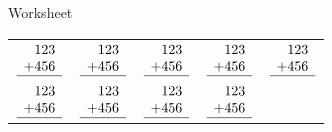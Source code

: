 \documentclass[20pt]{scrartcl}
\begin{document}
    \begin{center}
      \LARGE Worksheet
    \end{center}
    \begin{tabu} to \linewidth {XXXXX}
      $\begin{array}{r}
         123 \\
        +456 \\
        \hline
       \end{array}$
      &
      $\begin{array}{r}
         123 \\
        +456 \\
        \hline
       \end{array}$
      &
      $\begin{array}{r}
         123 \\
        +456 \\
        \hline
       \end{array}$
      &
      $\begin{array}{r}
         123 \\
        +456 \\
        \hline
       \end{array}$
      &
      $\begin{array}{r}
         123 \\
        +456 \\
        \hline
       \end{array}$
       \\ %
       $\begin{array}{r}
         123 \\
        +456 \\
        \hline
       \end{array}$
      &
      $\begin{array}{r}
         123 \\
        +456 \\
        \hline
       \end{array}$
      &
      $\begin{array}{r}
         123 \\
        +456 \\
        \hline
       \end{array}$
      &
      $\begin{array}{r}
         123 \\
        +456 \\
        \hline
       \end{array}$

\end{tabu}
\end{document}
